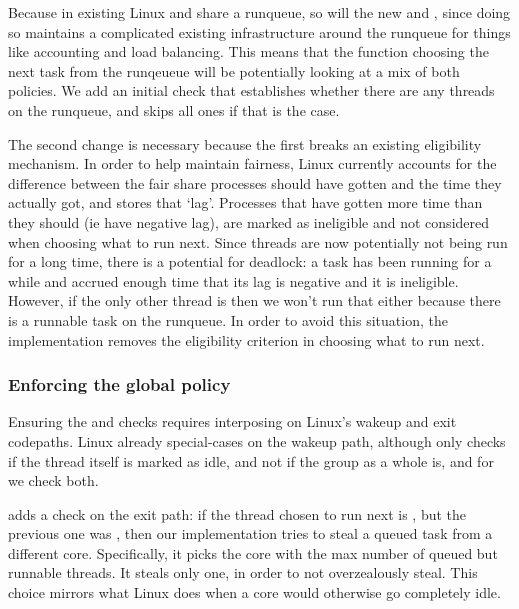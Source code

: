 Because in existing Linux \schedidle{} and \schednormal{} share a runqueue, so
will the new \schedbe{} and \schednormal{}, since doing so maintains a
complicated existing infrastructure around the runqueue for things like
accounting and load balancing. This means that the function choosing the next
task from the runqeueue will be potentially looking at a mix of both policies.
We add an initial check that establishes whether there are any \schednormal{}
threads on the runqueue, and skips all \schedbe{} ones if that is the case. 

The second change is necessary because the first breaks an existing eligibility
mechanism. In order to help maintain fairness, Linux currently accounts for the
difference between the fair share processes should have gotten and the time they
actually got, and stores that `lag'. Processes that have gotten more time than
they should (ie have negative lag), are marked as ineligible and not considered
when choosing what to run next. Since \schedbe{} threads are now potentially not
being run for a long time, there is a potential for deadlock: a \schednormal{}
task has been running for a while and accrued enough time that its lag is
negative and it is ineligible. However, if the only other thread is \schedbe{}
then we won't run that either because there is a runnable \schednormal{} task on
the runqueue. In order to avoid this situation, the implementation removes the
eligibility criterion in choosing what to run next.


\subsubsection{Enforcing the global policy}\label{ss:implementation:exit}

Ensuring the \entry{} and \exit{} checks requires interposing on Linux's wakeup
and exit codepaths. Linux already special-cases on the wakeup path, although
only checks if the thread itself is marked as idle, and not if the group as a
whole is, and for \schedbe{} we check both.

\schedbe{} adds a check on the exit path: if the thread chosen to run next is
\schedbe{}, but the previous one was \schednormal{}, then our implementation
tries to steal a queued \schednormal{} task from a different core. Specifically,
it picks the core with the max number of queued but runnable \schednormal{}
threads. It steals only one, in order to not overzealously steal. This choice
mirrors what Linux does when a core would otherwise go completely idle.